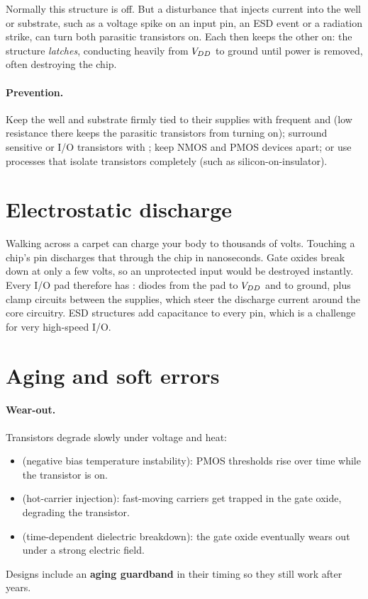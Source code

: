 Normally this structure is off. But a disturbance that injects current into the well or substrate, such as a voltage spike on an input pin, an ESD event or a radiation strike, can turn both parasitic transistors on. Each then keeps the other on: the structure \emph{latches}, conducting heavily from $V_{DD}$ to ground until power is removed, often destroying the chip.

\paragraph{Prevention.} Keep the well and substrate firmly tied to their supplies with frequent  and  (low resistance there keeps the parasitic transistors from turning on); surround sensitive or I/O transistors with ; keep NMOS and PMOS devices apart; or use processes that isolate transistors completely (such as silicon-on-insulator).

\section{Electrostatic discharge}

Walking across a carpet can charge your body to thousands of volts. Touching a chip's pin discharges that through the chip in nanoseconds. Gate oxides break down at only a few volts, so an unprotected input would be destroyed instantly. Every I/O pad therefore has : diodes from the pad to $V_{DD}$ and to ground, plus clamp circuits between the supplies, which steer the discharge current around the core circuitry. ESD structures add capacitance to every pin, which is a challenge for very high-speed I/O.

\section{Aging and soft errors}

\paragraph{Wear-out.} Transistors degrade slowly under voltage and heat:
\begin{itemize}
  \item {} (negative bias temperature instability): PMOS thresholds rise over time while the transistor is on.
  \item {} (hot-carrier injection): fast-moving carriers get trapped in the gate oxide, degrading the transistor.
  \item {} (time-dependent dielectric breakdown): the gate oxide eventually wears out under a strong electric field.
\end{itemize}
Designs include an \textbf{aging guardband} in their timing so they still work after years.

